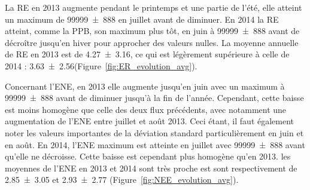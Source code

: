 

La RE en 2013 augmente pendant le printemps et une partie de l'été, elle atteint un maximum de \SI{99999(888)}{\uml} en juillet avant de diminuer.
En 2014 la RE atteint, comme la PPB, son maximum plus tôt, en juin à \SI{99999(888)}{\uml} avant de décroître jusqu'en hiver pour approcher des valeurs nulles.
La moyenne annuelle de RE en 2013 est de \SI{4.27(316)}{\uml}, ce qui est légèrement supérieure à celle de 2014 : \SI{3.63(256)}{\uml}(Figure~\ref{fig:ER_evolution_avg}).





Concernant l'ENE, en 2013 elle augmente jusqu'en juin avec un maximum à \SI{99999(888)}{\uml} avant de diminuer jusqu'à la fin de l'année.
Cependant, cette baisse est moins homogène que celle des deux flux précédents, avec notamment une augmentation de l'ENE entre juillet et août 2013.
Ceci étant, il faut également noter les valeurs importantes de la déviation standard particulièrement en juin et en août.
En 2014, l'ENE maximum est atteinte en juillet avec \SI{99999(888)}{\uml} avant qu'elle ne décroisse.
Cette baisse est cependant plus homogène qu'en 2013.
les moyennes de l'ENE en 2013 et 2014 sont très proche est sont respectivement de \SI{2.85(305)}{\uml} et \SI{2.93(277)}{\uml} (Figure~\ref{fig:NEE_evolution_avg}).



